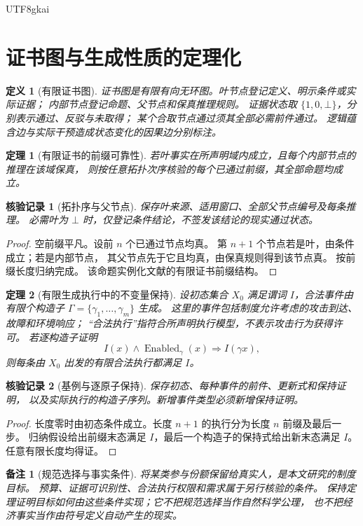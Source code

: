 \documentclass[12pt,a4paper,openany]{report}
\newtheorem{definition}{定义}[chapter]
\newtheorem{theorem}{定理}[chapter]
\newtheorem{remark}{备注}[chapter]
\newtheorem{Certificate}{核验记录}[chapter]
\begin{document}
\begin{CJK*}{UTF8}{gkai}
\section{证书图与生成性质的定理化}
\begin{definition}[有限证书图]
\label{def:dag}
证书图是有限有向无环图。叶节点登记定义、明示条件或实际证据；
内部节点登记命题、父节点和保真推理规则。
证据状态取 \(\{1,0,\bot\}\)，分别表示通过、反驳与未取得；
某个合取节点通过须其全部必需前件通过。
逻辑蕴含边与实际干预造成状态变化的因果边分别标注。
\end{definition}

\begin{theorem}[有限证书的前缀可靠性]
\label{thm:dag}
若叶事实在所声明域内成立，且每个内部节点的推理在该域保真，
则按任意拓扑次序核验的每个已通过前缀，其全部命题均成立。
\end{theorem}
\begin{Certificate}[拓扑序与父节点]
保存叶来源、适用窗口、全部父节点编号及每条推理。
必需叶为 \(\bot\) 时，仅登记条件结论，不签发该结论的现实通过状态。
\end{Certificate}
\begin{proof}
空前缀平凡。设前 \(n\) 个已通过节点均真。
第 \(n+1\) 个节点若是叶，由条件成立；若是内部节点，
其父节点先于它且均真，由保真规则得到该节点真。
按前缀长度归纳完成。
该命题实例化文献\cite{GRate}的有限证书前缀结构。
\end{proof}

\begin{theorem}[有限生成执行中的不变量保持]
\label{thm:generated}
设初态集合 \(X_0\) 满足谓词 \(I\)，合法事件由有限个构造子
\(\Gamma=\{\gamma_1,\ldots,\gamma_m\}\) 生成。
这里的事件包括制度允许考虑的攻击到达、故障和环境响应；
“合法执行”指符合所声明执行模型，不表示攻击行为获得许可。
若逐构造子证明
\[
I(x)\land\operatorname{Enabled}_{\gamma}(x)
\Longrightarrow I(\gamma x),
\]
则每条由 \(X_0\) 出发的有限合法执行都满足 \(I\)。
\end{theorem}
\begin{Certificate}[基例与逐原子保持]
保存初态、每种事件的前件、更新式和保持证明，
以及实际执行的构造子序列。新增事件类型必须新增保持证明。
\end{Certificate}
\begin{proof}
长度零时由初态条件成立。长度 \(n+1\) 的执行分为长度 \(n\) 前缀及最后一步。
归纳假设给出前缀末态满足 \(I\)，最后一个构造子的保持式给出新末态满足 \(I\)。
任意有限长度均得证。
\end{proof}

\begin{remark}[规范选择与事实条件]
将某类参与份额保留给真实人，是本文研究的制度目标。
预算、证据可识别性、合法执行权限和需求属于另行核验的条件。
保持定理证明目标如何由这些条件实现；它不把规范选择当作自然科学公理，
也不把经济事实当作由符号定义自动产生的现实。
\end{remark}


\end{CJK*}
\end{document}
